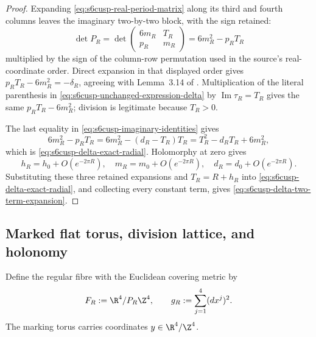 \begin{proof}
Expanding \eqref{eq:s6cusp-real-period-matrix} along its third and fourth
columns leaves the imaginary two-by-two block, with the sign retained:
\[
 \det P_R
 =\det\begin{pmatrix}6m_R&T_R\\p_R&m_R\end{pmatrix}
 =6m_R^2-p_RT_R
\]
multiplied by the sign of the column-row permutation used in the source's
real-coordinate order.  Direct expansion in that displayed order gives
\(p_RT_R-6m_R^2=-\delta_R\), agreeing with Lemma~3.14 of
\cite{S6Internal}.  Multiplication of the literal parenthesis in
\eqref{eq:s6cusp-unchanged-expression-delta} by
\(\operatorname{Im}\tau_R=T_R\) gives the same
 \(p_RT_R-6m_R^2\); division is legitimate because \(T_R>0\).

The last equality in \eqref{eq:s6cusp-imaginary-identities} gives
\[
 6m_R^2-p_RT_R
 =6m_R^2-(d_R-T_R)T_R
 =T_R^2-d_RT_R+6m_R^2,
\]
which is \eqref{eq:s6cusp-delta-exact-radial}.  Holomorphy at zero gives
\[
 h_R=h_0+O(e^{-2\pi R}),\quad
 m_R=m_0+O(e^{-2\pi R}),\quad
 d_R=d_0+O(e^{-2\pi R}).
\]
Substituting these three retained expansions and \(T_R=R+h_R\) into
\eqref{eq:s6cusp-delta-exact-radial}, and collecting every constant term,
gives \eqref{eq:s6cusp-delta-two-term-expansion}.
\end{proof}

\subsection{Marked flat torus, division lattice, and holonomy}

Define the regular fibre with the Euclidean covering metric by
\begin{equation}\label{eq:s6cusp-flat-fibre}
 F_R:=\R^4/P_R\Z^4,\qquad g_R:=\sum_{j=1}^4(dx^j)^2.
\end{equation}
The marking torus carries coordinates \(y\in\R^4/\Z^4\).

